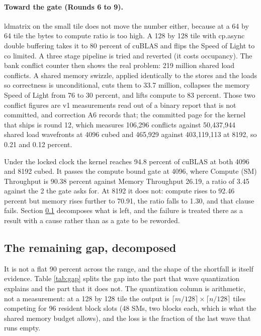 \paragraph{Toward the gate (Rounds 6 to 9).} ldmatrix on the small tile does not
move the number either, because at a 64 by 64 tile the bytes to compute ratio is
too high. A 128 by 128 tile with cp.async double buffering takes it to 80 percent
of cuBLAS and flips the Speed of Light to co limited. A three stage pipeline is
tried and reverted (it costs occupancy). The bank conflict counter then shows the
real problem: 219 million shared load conflicts. A shared memory swizzle, applied
identically to the stores and the loads so correctness is unconditional, cuts them
to 33.7 million, collapses the memory Speed of Light from 76 to 30 percent, and
lifts compute to 83 percent. Those two conflict figures are v1 measurements read
out of a binary report that is not committed, and correction A6 records that; the
committed page for the kernel that ships is round 12, which measures 106,296
conflicts against 50,437,944 shared load wavefronts at 4096 cubed and 465,929
against 403,119,113 at 8192, so 0.21 and 0.12 percent.

Under the locked clock the kernel reaches 94.8 percent of cuBLAS at both 4096 and
8192 cubed. It passes the compute bound gate at 4096, where Compute (SM) Throughput
is 90.38 percent against Memory Throughput 26.19, a ratio of 3.45 against the 2
the gate asks for. At 8192 it does not: compute rises to 92.46 percent but memory
rises further to 70.91, the ratio falls to 1.30, and that clause fails. Section
\ref{sec:gap} decomposes what is left, and the failure is treated there as a
result with a cause rather than as a gate to be reworded.

\subsection{The remaining gap, decomposed}
\label{sec:gap}

It is not a flat 90 percent across the range, and the shape of the shortfall is
itself evidence. Table \ref{tab:gap} splits the gap into the part that wave
quantization explains and the part that it does not. The quantization column is
arithmetic, not a measurement: at a 128 by 128 tile the output is
$\lceil m/128 \rceil \times \lceil n/128 \rceil$ tiles competing for 96 resident
block slots (48 SMs, two blocks each, which is what the shared memory budget
allows), and the loss is the fraction of the last wave that runs empty.

